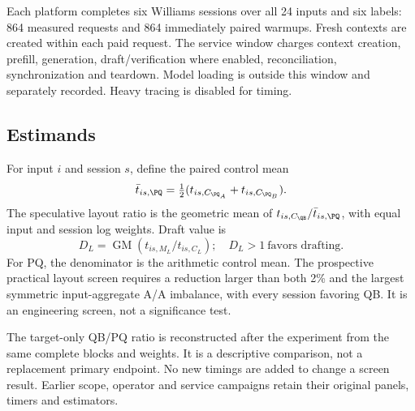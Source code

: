 Each platform completes six Williams sessions over all 24 inputs and six labels: 864 measured requests and 864 immediately paired warmups. Fresh contexts are created within each paid request. The service window charges context creation, prefill, generation, draft/verification where enabled, reconciliation, synchronization and teardown. Model loading is outside this window and separately recorded. Heavy tracing is disabled for timing.

\subsection{Estimands}
For input $i$ and session $s$, define the paired control mean
\begin{equation}
\bar t_{is,\PQ}=\tfrac12(t_{is,C_{\PQ_A}}+t_{is,C_{\PQ_B}}).
\end{equation}
The speculative layout ratio is the geometric mean of $t_{is,C_{\QB}}/\bar t_{is,\PQ}$, with equal input and session log weights. Draft value is
\begin{equation}
D_L=\operatorname{GM}\!\left(t_{is,M_L}/t_{is,C_L}\right);
\quad D_L>1\ \text{favors drafting}.
\label{eq:draftvalue}
\end{equation}
For PQ, the denominator is the arithmetic control mean. The prospective practical layout screen requires a reduction larger than both 2\% and the largest symmetric input-aggregate A/A imbalance, with every session favoring QB. It is an engineering screen, not a significance test.

The target-only QB/PQ ratio is reconstructed after the experiment from the same complete blocks and weights. It is a descriptive comparison, not a replacement primary endpoint. No new timings are added to change a screen result. Earlier scope, operator and service campaigns retain their original panels, timers and estimators.
